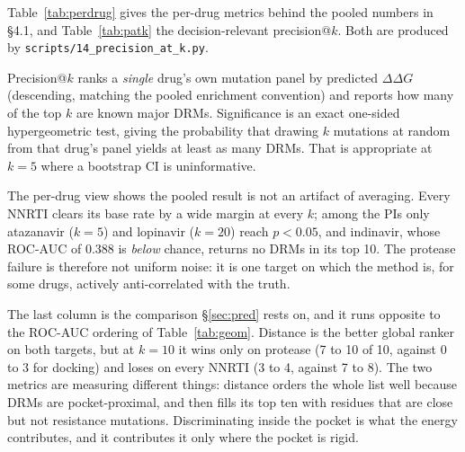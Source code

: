\documentclass{article}
\newcommand{\ddg}{\ensuremath{\Delta\Delta G}}
\begin{document}
Table~\ref{tab:perdrug} gives the per-drug metrics behind the pooled numbers in
\S4.1, and Table~\ref{tab:patk} the decision-relevant precision@$k$. Both are
produced by \texttt{scripts/14\_precision\_at\_k.py}.

Precision@$k$ ranks a \emph{single} drug's own mutation panel by predicted \ddg{}
(descending, matching the pooled enrichment convention) and reports how many of
the top $k$ are known major DRMs. Significance is an exact one-sided
hypergeometric test, giving the probability that drawing $k$ mutations at random
from that drug's panel yields at least as many DRMs. That is appropriate at $k=5$
where a bootstrap CI is uninformative.

The per-drug view shows the pooled result is not an artifact of averaging. Every
NNRTI clears its base rate by a wide margin at every $k$; among the PIs only
atazanavir ($k=5$) and lopinavir ($k=20$) reach $p<0.05$, and indinavir, whose
ROC-AUC of 0.388 is \emph{below} chance, returns no DRMs in its top 10. The
protease failure is therefore not uniform noise: it is one target on which the
method is, for some drugs, actively anti-correlated with the truth.

The last column is the comparison \S\ref{sec:pred} rests on, and it runs opposite
to the ROC-AUC ordering of Table~\ref{tab:geom}. Distance is the better global
ranker on both targets, but at $k=10$ it wins only on protease (7 to 10 of 10,
against 0 to 3 for docking) and loses on every NNRTI (3 to 4, against 7 to 8).
The two metrics are measuring different things: distance orders the whole list
well because DRMs are pocket-proximal, and then fills its top ten with residues
that are close but not resistance mutations. Discriminating inside the pocket is
what the energy contributes, and it contributes it only where the pocket is
rigid.
\end{document}
